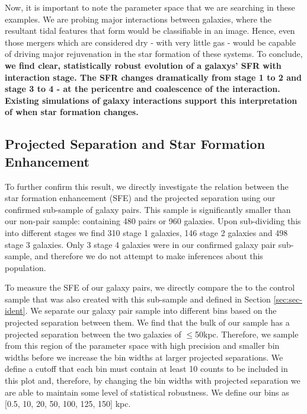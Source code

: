 \documentclass[fleqn,usenatbib]{mnras}
\begin{document}
Now, it is important to note the parameter space that we are searching in these examples. We are probing major interactions between galaxies, where the resultant tidal features that form would be classifiable in an image. Hence, even those mergers which are considered dry - with very little gas - would be capable of driving major rejuvenation in the star formation of these systems. To conclude, \textbf{we find clear, statistically robust evolution of a galaxys' SFR with interaction stage. The SFR changes dramatically from stage 1 to 2 and stage 3 to 4 - at the pericentre and coalescence of the interaction. Existing simulations of galaxy interactions support this interpretation of when star formation changes.}

\subsection{Projected Separation and Star Formation Enhancement}
\noindent To further confirm this result, we directly investigate the relation between the star formation enhancement (SFE) and the projected separation using our confirmed sub-sample of galaxy pairs. This sample is significantly smaller than our non-pair sample: containing 480 pairs or 960 galaxies. Upon sub-dividing this into different stages we find 310 stage 1 galaxies, 146 stage 2 galaxies and 498 stage 3 galaxies. Only 3 stage 4 galaxies were in our confirmed galaxy pair sub-sample, and therefore we do not attempt to make inferences about this population. 

To measure the SFE of our galaxy pairs, we directly compare the to the control sample that was also created with this sub-sample and defined in Section \ref{sec:sec-ident}. We separate our galaxy pair sample into different bins based on the projected separation between them. We find that the bulk of our sample has a projected separation between the two galaxies of $\leq$50kpc. Therefore, we sample from this region of the parameter space with high precision and smaller bin widths before we increase the bin widths at larger projected separations. We define a cutoff that each bin must contain at least 10 counts to be included in this plot and, therefore, by changing the bin widths with projected separation we are able to maintain some level of statistical robustness. We define our bins as [0.5, 10, 20, 50, 100, 125, 150] kpc.
\end{document}
